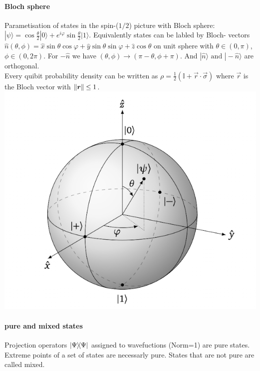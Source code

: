\paragraph{Bloch sphere}
\begin{multicols}{2}
  Parametisation of states in the spin-($1/2$) picture with Bloch sphere: $|\psi\rangle=\cos \frac{\theta}{2}|0\rangle+e^{i \varphi} \sin \frac{\theta}{2}|1\rangle$.
  Equivalently states can be labled by Bloch- vectors $\hat{n}(\theta, \phi) =\hat{x} \sin \theta \cos \varphi+ \hat{y} \sin \theta \sin \varphi+\hat{z} \cos \theta$ 
  on unit sphere with $\theta \in (0, \pi)$, $\phi \in (0,2 \pi)$. For $- \hat{n}$ we have $(\theta, \phi) \to (\pi - \theta , \phi + \pi) $. And $|\hat{n}\rangle \text { and }|-\hat{n}\rangle $
  are orthogonal.\\
  Every quibit probability density can be written as $\rho=\frac{1}{2}(\mathbb{I}+\vec{r} \cdot \vec{\sigma})$
  where $\vec{r}$ is the Bloch vector with $\norm{\boldsymbol{r}} \leq 1$.
    \hspace*{2.5cm} \includegraphics[scale=0.35]{fig/BlochSph.png}
\end{multicols}

\paragraph{pure and mixed states} Projection operators $\ketbra{\Psi}{\Psi}$ assigned to wavefuctions (Norm=1) are pure states. Extreme points of a set of 
states are necessarly pure. States that are not pure are called mixed. 

